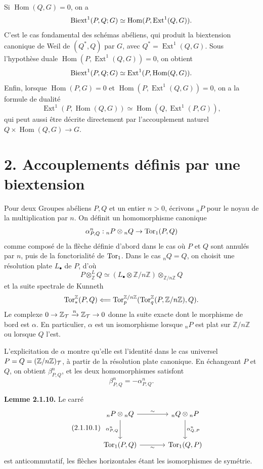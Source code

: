 \documentclass[11pt]{article}
\providecommand{\Hom}{\operatorname{Hom}}
\providecommand{\Ext}{\operatorname{Ext}}
\begin{document}
Si \(\Hom(Q,G)=0\), on a
\[
        \Biext^1(P,Q;G)\simeq\Hom(P,\Ext^1(Q,G)).
\]
C'est le cas fondamental des schémas abéliens, qui produit la biextension canonique de Weil de \((Q^*,Q)\) par \(G\), avec \(Q^*=\Ext^1(Q,G)\).  Sous l'hypothèse duale \(\Hom(P,\Ext^1(Q,G))=0\), on obtient
\[
        \Biext^1(P,Q;G)\simeq \Ext^1(P,\Hom(Q,G)).
\]
Enfin, lorsque \(\Hom(P,G)=0\) et \(\Hom(P,\Ext^1(Q,G))=0\), on a la formule de dualité
\[
        \Ext^1(P,\Hom(Q,G))\simeq\Hom(Q,\Ext^1(P,G)),
\]
qui peut aussi être décrite directement par l'accouplement naturel \(Q\times\Hom(Q,G)\to G\).

\section*{2. Accouplements définis par une biextension}

Pour deux Groupes abéliens \(P,Q\) et un entier \(n>0\), écrivons \({}_nP\) pour le noyau de la multiplication par \(n\).  On définit un homomorphisme canonique
\[
        \alpha^n_{P,Q}:{}_nP\otimes{}_nQ\to\operatorname{Tor}_1(P,Q)
\]
comme composé de la flèche définie d'abord dans le cas où \(P\) et \(Q\) sont annulés par \(n\), puis de la fonctorialité de \(\operatorname{Tor}_1\).  Dans le cas \({}_nQ=Q\), on choisit une résolution plate \(L_\bullet\) de \(P\), d'où
\[
        P\otimes^L_{\mathbb Z}Q\simeq
        (L_\bullet\otimes\mathbb Z/n\mathbb Z)\otimes_{\mathbb Z/n\mathbb Z}Q
\]
et la suite spectrale de Kunneth
\[
        \operatorname{Tor}_*^{\mathbb Z}(P,Q)
        \Longleftarrow
        \operatorname{Tor}_p^{\mathbb Z/n\mathbb Z}(\operatorname{Tor}_q^{\mathbb Z}(P,\mathbb Z/n\mathbb Z),Q).
\]
Le complexe \(0\to\mathbb Z_\mathcal T\xrightarrow{n}\mathbb Z_\mathcal T\to0\) donne la suite exacte dont le morphisme de bord est \(\alpha\).  En particulier, \(\alpha\) est un isomorphisme lorsque \({}_nP\) est plat sur \(\mathbb Z/n\mathbb Z\) ou lorsque \(Q\) l'est.

L'explicitation de \(\alpha\) montre qu'elle est l'identité dans le cas universel \(P=Q=(\mathbb Z/n\mathbb Z)_\mathcal T\), à partir de la résolution plate canonique.  En échangeant \(P\) et \(Q\), on obtient \(\beta^n_{P,Q}\), et les deux homomorphismes satisfont
\[
        \beta^n_{P,Q}=-\alpha^n_{P,Q}.
\]

\textbf{Lemme 2.1.10.}  Le carré
\begin{equation}\tag{2.1.10.1}
\begin{tikzcd}[column sep=large,row sep=large]
{}_nP\otimes{}_nQ \arrow[r,"\sim"] \arrow[d,"\alpha^n_{P,Q}"']
  & {}_nQ\otimes{}_nP \arrow[d,"\alpha^n_{Q,P}"]\\
\Torop_1(P,Q) \arrow[r,"\sim"'] & \Torop_1(Q,P)
\end{tikzcd}
\end{equation}
est anticommutatif, les flèches horizontales étant les isomorphismes de symétrie.
\end{document}
